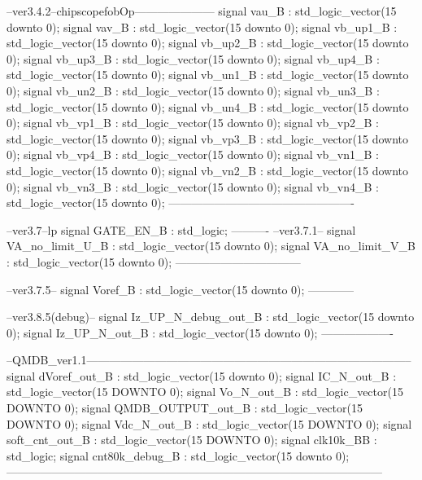 \begin{mylisting}[language=VHDL,caption=トップモジュール,label=appF_Top_module_VHDL]
	--ver3.4.2--chipscopefobOp---------------------
	signal vau_B        : std_logic_vector(15 downto 0);
	signal vav_B        : std_logic_vector(15 downto 0);
	signal vb_up1_B     : std_logic_vector(15 downto 0);
	signal vb_up2_B     : std_logic_vector(15 downto 0);
	signal vb_up3_B     : std_logic_vector(15 downto 0);
	signal vb_up4_B     : std_logic_vector(15 downto 0);
	signal vb_un1_B     : std_logic_vector(15 downto 0);
	signal vb_un2_B     : std_logic_vector(15 downto 0);
	signal vb_un3_B     : std_logic_vector(15 downto 0);
	signal vb_un4_B     : std_logic_vector(15 downto 0);
	signal vb_vp1_B     : std_logic_vector(15 downto 0);
	signal vb_vp2_B     : std_logic_vector(15 downto 0);
	signal vb_vp3_B     : std_logic_vector(15 downto 0);
	signal vb_vp4_B     : std_logic_vector(15 downto 0);
	signal vb_vn1_B     : std_logic_vector(15 downto 0);
	signal vb_vn2_B     : std_logic_vector(15 downto 0);
	signal vb_vn3_B     : std_logic_vector(15 downto 0);
	signal vb_vn4_B     : std_logic_vector(15 downto 0);
	-------------------------------------------------
	
	--ver3.7--lp
	signal GATE_EN_B    : std_logic;
	----------
	--ver3.7.1--
	signal VA_no_limit_U_B : std_logic_vector(15 downto 0);
	signal VA_no_limit_V_B : std_logic_vector(15 downto 0);
	---------------------------------
	
	--ver3.7.5--
	signal Voref_B	: std_logic_vector(15 downto 0);
	------------
	
	--ver3.8.5(debug)--
	signal Iz_UP_N_debug_out_B : std_logic_vector(15 downto 0);
	signal Iz_UP_N_out_B 	   : std_logic_vector(15 downto 0);
	-------------------
	
--QMDB_ver1.1--------------------------------------------------------------------------------------
	signal	dVoref_out_B        : std_logic_vector(15 downto 0);
	signal	IC_N_out_B	        : std_logic_vector(15 DOWNTO 0);
	signal	Vo_N_out_B	        : std_logic_vector(15 DOWNTO 0);
	signal	QMDB_OUTPUT_out_B   : std_logic_vector(15 DOWNTO 0);
	signal	Vdc_N_out_B		     : std_logic_vector(15 DOWNTO 0);
	signal   soft_cnt_out_B		  : std_logic_vector(15 DOWNTO 0);
	signal   clk10k_BB			  : std_logic;
	signal   cnt80k_debug_B		  : std_logic_vector(15 downto 0);
---------------------------------------------------------------------------------------------------


\end{mylisting}
